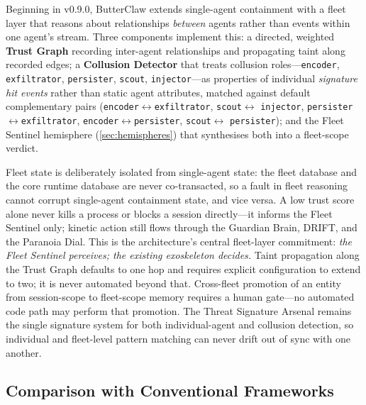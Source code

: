\documentclass[11pt,a4paper]{article}
\begin{document}
Beginning in v0.9.0, ButterClaw extends single-agent containment with a fleet layer that reasons
about relationships \emph{between} agents rather than events within one agent's stream. Three
components implement this: a directed, weighted \textbf{Trust Graph} recording inter-agent
relationships and propagating taint along recorded edges; a \textbf{Collusion Detector} that
treats collusion roles---\texttt{encoder}, \texttt{exfiltrator}, \texttt{persister},
\texttt{scout}, \texttt{injector}---as properties of individual \emph{signature hit events} rather
than static agent attributes, matched against default complementary pairs
(\texttt{encoder}$\leftrightarrow$\texttt{exfiltrator}, \texttt{scout}$\leftrightarrow$
\texttt{injector}, \texttt{persister}$\leftrightarrow$\texttt{exfiltrator},
\texttt{encoder}$\leftrightarrow$\texttt{persister}, \texttt{scout}$\leftrightarrow$
\texttt{persister}); and the Fleet Sentinel hemisphere (\cref{sec:hemispheres}) that synthesises
both into a fleet-scope verdict.

Fleet state is deliberately isolated from single-agent state: the fleet database and the core
runtime database are never co-transacted, so a fault in fleet reasoning cannot corrupt
single-agent containment state, and vice versa. A low trust score alone never kills a process or
blocks a session directly---it informs the Fleet Sentinel only; kinetic action still flows through
the Guardian Brain, DRIFT, and the Paranoia Dial. This is the architecture's central fleet-layer
commitment: \emph{the Fleet Sentinel perceives; the existing exoskeleton decides.} Taint
propagation along the Trust Graph defaults to one hop and requires explicit configuration to
extend to two; it is never automated beyond that. Cross-fleet promotion of an entity from
session-scope to fleet-scope memory requires a human gate---no automated code path may perform
that promotion. The Threat Signature Arsenal remains the single signature system for both
individual-agent and collusion detection, so individual and fleet-level pattern matching can never
drift out of sync with one another.

\subsection{Comparison with Conventional Frameworks}
\end{document}

